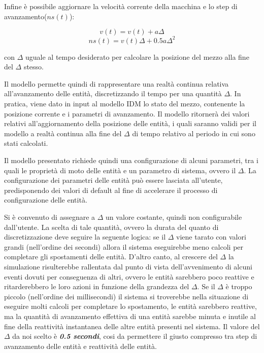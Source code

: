 
Infine è possibile aggiornare la velocità corrente della macchina e lo step di
avanzamento($ns(t)$): 

\begin{equation}
v(t)= v(t)+a\Delta
\end{equation}
\begin{equation}
ns(t)= v(t)\Delta+0.5a\Delta^2
\end{equation}

con $\Delta$ uguale al tempo desiderato per calcolare la posizione del mezzo
alla fine del $\Delta$ stesso. 

Il modello permette quindi di rappresentare una realtà continua relativa
all'avanzamento delle entità, discretizzando il tempo per una quantità $\Delta$.
In pratica, viene dato in input al modello \ac{IDM} lo stato del mezzo,
contenente la posizione corrente e i parametri di avanzamento.
Il modello ritornerà dei valori relativi all'aggiornamento della posizione delle
entità, i quali saranno validi per il modello a realtà continua alla fine
del $\Delta$ di tempo relativo al periodo in cui sono stati calcolati.

Il modello presentato richiede quindi una configurazione di alcuni parametri,
tra i quali le proprietà di moto delle entità e un parametro di sistema, ovvero
il $\Delta$. La configurazione dei parametri delle entità può essere lasciata
all'utente, predisponendo dei valori di default al fine di accelerare il
processo di configurazione delle entità.

Si è convenuto di assegnare a $\Delta$ un valore costante, quindi non
configurabile dall'utente. La scelta di tale quantità, ovvero la durata
del quanto di discretizzazione deve seguire la seguente logica:
se il $\Delta$ viene tarato con valori grandi (nell'ordine dei secondi) allora
il sistema eseguirebbe meno calcoli per completare gli spostamenti delle entità.
D'altro canto, al crescere del $\Delta$ la simulazione risulterebbe rallentata
dal punto di vista dell'avvenimento di alcuni eventi dovuti per conseguenza di
altri, ovvero le entità sarebbero poco reattive e ritarderebbero le loro azioni
in funzione della grandezza del $\Delta$. Se il $\Delta$ è troppo piccolo
(nell'ordine dei millisecondi) il sistema si troverebbe nella situazione di
eseguire molti calcoli per completare lo spostamento, le entità sarebbero
reattive, ma la quantità di avanzamento effettiva di una entità sarebbe minuta e
inutile al fine della reattività instantanea delle altre entità presenti nel
sistema. Il valore del $\Delta$ da noi scelto è \textbf{\textit{0.5 secondi}},
cosi da permettere il giusto compresso tra step di avanzamento delle entità e
reattività delle entità.